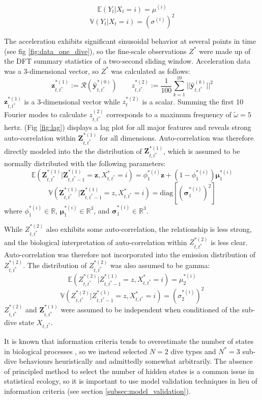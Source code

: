 $$\mathbb{E}(Y_t|X_t = i) = \mu^{(i)}$$
$$\mathbb{V}(Y_t|X_t = i) = \left(\sigma^{(i)}\right)^2$$

The acceleration exhibits significant sinusoidal behavior at several points in time (see fig \ref{fig:data_one_dive}), so the fine-scale observations $Z^*$ were made up of the DFT summary statistics of a two-second sliding window. Acceleration data was a 3-dimensional vector, so $Z^*$ was calculated as follows:
%
$$\mathbf{z}_{t,t^*}^{*(1)} := \mathcal{R}\left(\hat{\mathbf{y}}^{*(0)}_{t,t^*}\right) \qquad z_{t,t^*}^{*(2)} := \frac{1}{100}\sum_{k=1}^{10}||\hat{\mathbf{y}}^{(k)}_{t,t^*}||^2$$
%
$\mathbf{z}_{t,t^*}^{*(1)}$ is a 3-dimensional vector while $z_t^{*(2)}$ is a scalar. Summing the first 10 Fourier modes to calculate $z^{(2)}_{t,t^*}$ corresponds to a maximum frequency of $\tilde \omega = 5$ hertz. (Fig \ref{fig:lag}) displays a lag plot for all major features and reveals strong auto-correlation within $\mathbf{Z}^{*(1)}_{t,t^*}$ for all dimensions. Auto-correlation was therefore directly modeled into the the distribution of $\mathbf{Z}^{*(1)}_{t,t^*}$, which is assumed to be normally distributed with the following parameters:
%
$$\mathbb{E}(\mathbf{Z}^{*(1)}_{t,t^*}|\mathbf{Z}^{*(1)}_{t,t^*-1} = \mathbf{z}, X^*_{t,t^*} = i) = \phi_1^{*(i)} \mathbf{z} + (1-\phi_1^{*(i)}) \mathbf{\mu}_1^{*(i)}$$
$$\mathbb{V}(\mathbf{Z}^{*(1)}_{t,t^*}|\mathbf{Z}^{*(1)}_{t,t^*-1} = z,X^*_{t,t^*} = i) = \text{diag}\left[\left(\mathbf{\sigma}_1^{*(i)}\right)^2\right]$$
%
where $\phi_1^{*(i)} \in \mathbb{R}$, $\mathbf{\mu}_1^{*(i)} \in \mathbb{R}^3$, and $\mathbf{\sigma}_1^{*(i)} \in \mathbb{R}^3$.

While $Z^{*(2)}_{t,t^*}$ also exhibits some auto-correlation, the relationship is less strong, and the biological interpretation of auto-correlation within $Z^{*(2)}_{t,t^*}$ is less clear. Auto-correlation was therefore not incorporated into the emission distribution of $Z^{*(2)}_{t,t^*}$. The distribution of $Z^{*(2)}_{t,t^*}$ was also assumed to be gamma:
%
$$\mathbb{E}(Z^{*(2)}_{t,t^*}|Z^{*(1)}_{t,t^*-1} = z,X^*_{t,t^*} = i) = \mu_2^{*(i)}$$
$$\mathbb{V}(Z^{*(2)}_{t,t^*}|Z^{*(1)}_{t,t^*-1} = z,X^*_{t,t^*} = i) = \left(\sigma_2^{*(i)}\right)^2$$
%
$Z^{*(2)}_{t,t^*}$ and $\mathbf{Z}^{*(1)}_{t,t^*}$ were assumed to be independent when conditioned of the sub-dive state $X_{t,t^*}$.

It is known that information criteria tends to overestimate the number of states in biological processes \citep{Pohle:2017}, so we instead selected $N = 2$ dive types and $N^* = 3$ sub-dive behaviours heuristically and admittedly somewhat arbitrarily. The absence of principled method to select the number of hidden states is a common issue in statistical ecology, so it is important to use model validation techniques in lieu of information criteria (see section \ref{subsec:model_validation}).

